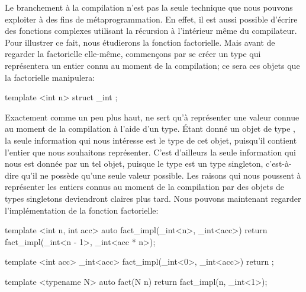 Le branchement à la compilation n'est pas la seule technique que nous pouvons
exploiter à des fins de métaprogrammation. En effet, il est aussi possible
d'écrire des fonctions complexes utilisant la récursion à l'intérieur même du
compilateur. Pour illustrer ce fait, nous étudierons la fonction factorielle.
Mais avant de regarder la factorielle elle-même, commençons par se créer un
type qui représentera un entier connu au moment de la compilation; ce sera ces
objets que la factorielle manipulera:
\begin{cpp}
    template <int n>
    struct _int { };
\end{cpp}

Exactement comme  un peu plus haut,  ne sert qu'à
représenter une valeur connue au moment de la compilation à l'aide d'un type.
Étant donné un objet de type , la seule information qui nous
intéresse est le type de cet objet, puisqu'il contient l'entier que nous
souhaitons représenter. C'est d'ailleurs la seule information qui nous est
donnée par un tel objet, puisque le type  est un type singleton,
c'est-à-dire qu'il ne possède qu'une seule valeur possible. Les raisons qui
nous poussent à représenter les entiers connus au moment de la compilation
par des objets de types singletons deviendront claires plus tard. Nous pouvons
maintenant regarder l'implémentation de la fonction factorielle:
\begin{cpp}
    template <int n, int acc>
    auto fact_impl(_int<n>, _int<acc>)
    { return fact_impl(_int<n - 1>{}, _int<acc * n>{}); }

    template <int acc>
    _int<acc> fact_impl(_int<0>, _int<acc>)
    { return {}; }

    template <typename N>
    auto fact(N n)
    { return fact_impl(n, _int<1>{}); }
\end{cpp}

